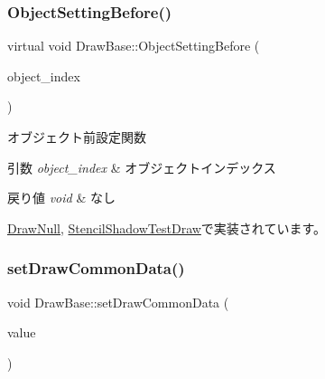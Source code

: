 \mbox{\label{class_draw_base_a9bf55f6b67735e0bff42d749f43826c1}} 
\subsubsection{\texorpdfstring{Object\+Setting\+Before()}{ObjectSettingBefore()}}
{\footnotesize\ttfamily virtual void Draw\+Base\+::\+Object\+Setting\+Before (\begin{DoxyParamCaption}\item[{unsigned}]{object\+\_\+index }\end{DoxyParamCaption})\hspace{0.3cm}{\ttfamily [pure virtual]}}



オブジェクト前設定関数 


\begin{DoxyParams}{引数}
{\em object\+\_\+index} & オブジェクトインデックス \\
\hline
\end{DoxyParams}

\begin{DoxyRetVals}{戻り値}
{\em void} & なし \\
\hline
\end{DoxyRetVals}


\mbox{\hyperlink{class_draw_null_ac79a0adfc83537d5e677851463bb3028}{Draw\+Null}}, \mbox{\hyperlink{class_stencil_shadow_test_draw_ab798b88896ba3f0b3de057dff49823be}{Stencil\+Shadow\+Test\+Draw}}で実装されています。

\mbox{\label{class_draw_base_a75591fe15951811f294dc964a7894214}} 
\subsubsection{\texorpdfstring{set\+Draw\+Common\+Data()}{setDrawCommonData()}}
{\footnotesize\ttfamily void Draw\+Base\+::set\+Draw\+Common\+Data (\begin{DoxyParamCaption}\item[{\mbox{\hyperlink{class_draw_common_data}{Draw\+Common\+Data}} $\ast$}]{value }\end{DoxyParamCaption})}



